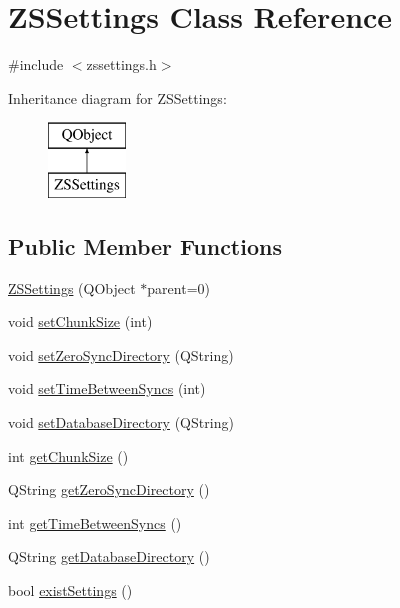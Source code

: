 \hypertarget{class_z_s_settings}{\section{Z\-S\-Settings Class Reference}
\label{class_z_s_settings}
}


{\ttfamily \#include $<$zssettings.\-h$>$}

Inheritance diagram for Z\-S\-Settings\-:\begin{figure}[H]
\begin{center}
\leavevmode
\includegraphics[height=2.000000cm]{class_z_s_settings}
\end{center}
\end{figure}
\subsection*{Public Member Functions}
\begin{DoxyCompactItemize}
\item 
\hyperlink{class_z_s_settings_a03b2e67c7c6b0360be693761c34d7fe1}{Z\-S\-Settings} (Q\-Object $\ast$parent=0)
\item 
void \hyperlink{class_z_s_settings_a26e445d128698db67df26527afb874b9}{set\-Chunk\-Size} (int)
\item 
void \hyperlink{class_z_s_settings_adaae344d9e45743c89ff6e8df3ca5839}{set\-Zero\-Sync\-Directory} (Q\-String)
\item 
void \hyperlink{class_z_s_settings_a5b7f4dae489262ca9d75729d9cd58694}{set\-Time\-Between\-Syncs} (int)
\item 
void \hyperlink{class_z_s_settings_afe7252a0bb19d4dca3480f7189fba64c}{set\-Database\-Directory} (Q\-String)
\item 
int \hyperlink{class_z_s_settings_aceabc9586abb6fb3d5d6779c593fec9d}{get\-Chunk\-Size} ()
\item 
Q\-String \hyperlink{class_z_s_settings_a449de5e3a46a864f0e507d653ebee9db}{get\-Zero\-Sync\-Directory} ()
\item 
int \hyperlink{class_z_s_settings_abe9ac4a70884088e5c9dc8a430c847b1}{get\-Time\-Between\-Syncs} ()
\item 
Q\-String \hyperlink{class_z_s_settings_a3060fdb56a70007480e11178e174e56c}{get\-Database\-Directory} ()
\item 
bool \hyperlink{class_z_s_settings_adb668cc8ff7cb7a06a00614ba88747c0}{exist\-Settings} ()
\end{DoxyCompactItemize}


